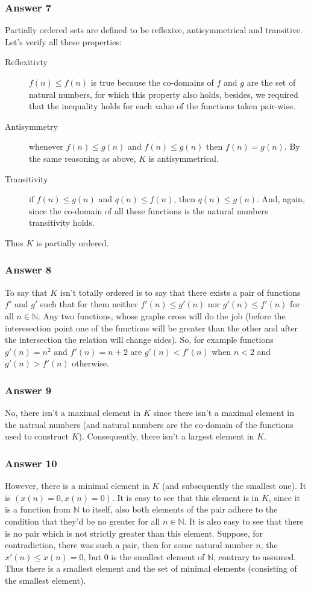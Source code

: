 \documentclass[11pt]{article}
\begin{document}
\subsubsection{Answer 7}
\label{sec-1-3-1}
Partially ordered sets are defined to be reflexive, antisymmetrical and
transitive. Let's verify all these properties:
\begin{description}
\item[{Reflexitivty}] $f(n) \leq f(n)$ is true because the co-domains of $f$ and
$g$ are the set of natural numbers, for which this property also holds, besides,
we required that the inequality holds for each value of the functions taken
pair-wise.
\item[{Antisymmetry}] whenever $f(n) \leq g(n)$ and $f(n) \leq g(n)$
then $f(n) = g(n)$.  By the same reasoning as above, $K$ is antisymmetrical.
\item[{Transitivity}] if $f(n) \leq g(n)$ and $q(n) \leq f(n)$, then $q(n) \leq g(n)$.
And, again, since the co-domain of all these functions is the natural numbers
transitivity holds.
\end{description}

Thus $K$ is partially ordered.
\subsubsection{Answer 8}
\label{sec-1-3-2}
To say that $K$ isn't totally ordered is to say that there exists a pair of
functions $f'$ and $g'$ such that for them neither $f'(n) \leq g'(n)$ nor
$g'(n) \leq f'(n)$ for all $n \in \mathbb{N}$.  Any two functions, whose graphs
cross will do the job (before the interesection point one of the functions
will be greater than the other and after the intersection the relation will
change sides).  So, for example functions $g'(n)=n^2$ and $f'(n)=n+2$ are
$g'(n) < f'(n)$ when $n < 2$ and $g'(n) > f'(n)$ otherwise.
\subsubsection{Answer 9}
\label{sec-1-3-3}
No, there isn't a maximal element in $K$ since there isn't a maximal element
in the natrual numbers (and natural numbers are the co-domain of the functions
used to construct $K$). Consequently, there isn't a largest element in $K$.
\subsubsection{Answer 10}
\label{sec-1-3-4}
However, there is a minimal element in $K$ (and subsequently the smallest one).
It is $(x(n)=0, x(n)=0)$.  It is easy to see that this element is in $K$,
since it is a function from $\mathbb{N}$ to itself, also both elements of the
pair adhere to the condition that they'd be no greater for all $n \in \mathbb{N}$.
It is also easy to see that there is no pair which is not strictly greater
than this element.  Suppose, for contradiction, there was such a pair, then
for some natural number $n$, the $x'(n) \leq x(n) = 0$, but 0 is the smallest
element of $\mathbb{N}$, contrary to assumed.  Thus there is a smallest element
and the set of minimal elements (consisting of the smallest element).
\end{document}

